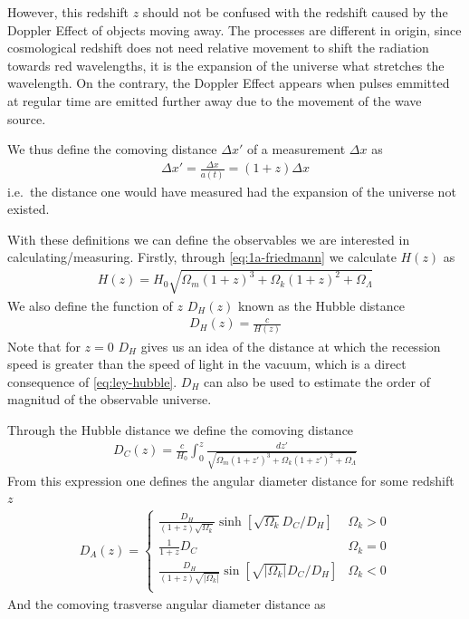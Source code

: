 However, this redshift $z$ should not be confused with the redshift caused by the Doppler Effect of objects moving away. The processes are different in origin, since cosmological redshift does not need relative movement to shift the radiation towards red wavelengths, it is the expansion of the universe what stretches the wavelength. On the contrary, the Doppler Effect appears when pulses emmitted at regular time are emitted further away due to the movement of the wave source.

We thus define the comoving distance $\Delta x'$ of a measurement $\Delta x$ as 
\begin{align}
	\Delta x' =\frac{\Delta x}{a(t)}= (1+z)\Delta x
\end{align}
i.e.\ the distance one would have measured had the expansion of the universe not existed.

With these definitions we can define  the observables we are interested in calculating/measuring. Firstly, through \eqref{eq:1a-friedmann} we calculate $H(z)$ as  
\begin{align}
	H(z) = H_0 \sqrt{\Omega_m(1+z)^3 + \Omega_k(1+z)^2 + \Omega_\Lambda} 
\end{align}
We also define the function of $z$ $D_H(z)$ known as the Hubble distance
\begin{align}
	D_H(z)  = \frac{c}{H(z)}
\end{align}
Note that for $z = 0$ $D_H$ gives us an idea of the distance at which the recession speed is greater than the speed of light in the vacuum, which is a direct consequence of \eqref{eq:ley-hubble}. $D_H$ can also be used to estimate the order of magnitud of the observable universe.

Through the Hubble distance we define the comoving distance 
\begin{align}
	D_C(z) = \frac{c}{H_0}\int_{0}^{z} \frac{dz'}{\sqrt{\Omega_m(1+z')^3 + \Omega_k(1+z')^2 + \Omega_\Lambda} } 
\end{align}
From this expression one defines the angular diameter distance for some redshift $z$
\begin{align}
	D_A(z) = \begin{cases}
		\frac{D_H}{\left( 1+z \right) \sqrt{\Omega_k} }\sinh \left[ \sqrt{\Omega_k} D_C /D_H \right]  	 &\Omega_k >0\\
		\frac{1}{1+z}D_C& \Omega_k =  0\\
		\frac{D_H}{\left( 1+z \right) \sqrt{|\Omega_k|}} \sin \left[ \sqrt{|\Omega_k|} D_C /D_H \right]  	 &\Omega_k <0\\
	\end{cases}
\end{align}
And the comoving trasverse angular diameter distance as 

